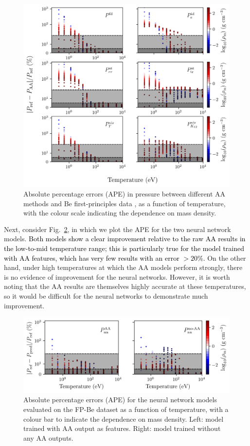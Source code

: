 \documentclass[%
 preprint,
 superscriptaddress,
 amsmath,amssymb,
longbibliography,
]{revtex4-2}
\newcommand{\change}[1]{\textcolor{black}{#1}}
\begin{document}
\begin{figure}
    \centering
    \includegraphics{../figs/error_temp_aa_Be.png}
    \caption{Absolute percentage errors (APE) in pressure between different AA methods and Be first-principles data \cite{Hu_Be_EOS}, as a function of temperature, with the colour scale indicating the dependence on mass density.}
    \label{fig:err_T_aa_Be}
\end{figure}


Next, consider Fig.~\ref{fig:err_T_nn_Be}, in which we plot the APE for the two neural network models. \change{Both models show a clear improvement relative to the raw AA results in the low-to-mid temperature range; this is particularly true for the model trained with AA features, which has very few results with an error $>20\%$.} On the other hand, under high temperatures at which the AA models perform strongly, there is no evidence of improvement for the neural networks. However, it is worth noting that the AA results are themselves highly accurate at these temperatures, so it would be difficult for the neural networks to demonstrate much improvement. 


\begin{figure}
    \centering
    \includegraphics{../figs/error_temp_nn_Be.png}
    \caption{Absolute percentage errors (APE) for the neural network models evaluated on the FP-Be dataset \cite{Hu_Be_EOS} as a function of temperature, with a colour bar to indicate the dependence on mass density. Left: model trained with AA output as features. Right: model trained without any AA outputs.}
    \label{fig:err_T_nn_Be}
\end{figure}
\end{document}

